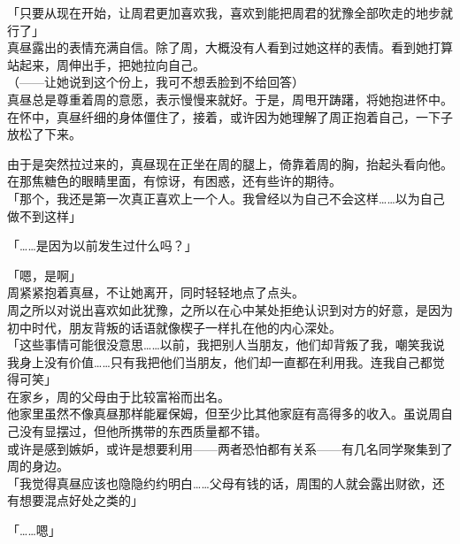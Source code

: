 「只要从现在开始，让周君更加喜欢我，喜欢到能把周君的犹豫全部吹走的地步就行了」\\

真昼露出的表情充满自信。除了周，大概没有人看到过她这样的表情。看到她打算站起来，周伸出手，把她拉向自己。\\

（——让她说到这个份上，我可不想丢脸到不给回答）\\

真昼总是尊重着周的意愿，表示慢慢来就好。于是，周甩开踌躇，将她抱进怀中。\\

在怀中，真昼纤细的身体僵住了，接着，或许因为她理解了周正抱着自己，一下子放松了下来。

由于是突然拉过来的，真昼现在正坐在周的腿上，倚靠着周的胸，抬起头看向他。\\

在那焦糖色的眼睛里面，有惊讶，有困惑，还有些许的期待。\\

「那个，我还是第一次真正喜欢上一个人。我曾经以为自己不会这样……以为自己做不到这样」

「……是因为以前发生过什么吗？」

「嗯，是啊」\\

周紧紧抱着真昼，不让她离开，同时轻轻地点了点头。\\

周之所以对说出喜欢如此犹豫，之所以在心中某处拒绝认识到对方的好意，是因为初中时代，朋友背叛的话语就像楔子一样扎在他的内心深处。\\

「这些事情可能很没意思……以前，我把别人当朋友，他们却背叛了我，嘲笑我说我身上没有价值……只有我把他们当朋友，他们却一直都在利用我。连我自己都觉得可笑」\\

在家乡，周的父母由于比较富裕而出名。\\

他家里虽然不像真昼那样能雇保姆，但至少比其他家庭有高得多的收入。虽说周自己没有显摆过，但他所携带的东西质量都不错。\\

或许是感到嫉妒，或许是想要利用——两者恐怕都有关系——有几名同学聚集到了周的身边。\\

「我觉得真昼应该也隐隐约约明白……父母有钱的话，周围的人就会露出财欲，还有想要混点好处之类的」

「……嗯」\\


